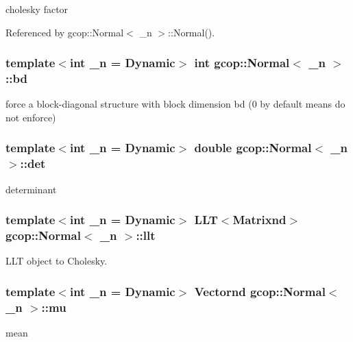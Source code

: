 cholesky factor 



\-Referenced by gcop\-::\-Normal$<$ \-\_\-n $>$\-::\-Normal().

\subsubsection[{bd}]{\setlength{\rightskip}{0pt plus 5cm}template$<$int \-\_\-n = \-Dynamic$>$ int {\bf gcop\-::\-Normal}$<$ \-\_\-n $>$\-::{\bf bd}}\label{classgcop_1_1Normal_a7f1a5099950d5e0fc7a71f97e4d03202}


force a block-\/diagonal structure with block dimension bd (0 by default means do not enforce) 

\subsubsection[{det}]{\setlength{\rightskip}{0pt plus 5cm}template$<$int \-\_\-n = \-Dynamic$>$ double {\bf gcop\-::\-Normal}$<$ \-\_\-n $>$\-::{\bf det}}\label{classgcop_1_1Normal_a3002ef044ffb2b63e8d371505ea0d6e0}


determinant 

\subsubsection[{llt}]{\setlength{\rightskip}{0pt plus 5cm}template$<$int \-\_\-n = \-Dynamic$>$ \-L\-L\-T$<${\bf \-Matrixnd}$>$ {\bf gcop\-::\-Normal}$<$ \-\_\-n $>$\-::{\bf llt}}\label{classgcop_1_1Normal_af08c704c90adabb300fc5741325ab769}


\-L\-L\-T object to \-Cholesky. 

\subsubsection[{mu}]{\setlength{\rightskip}{0pt plus 5cm}template$<$int \-\_\-n = \-Dynamic$>$ {\bf \-Vectornd} {\bf gcop\-::\-Normal}$<$ \-\_\-n $>$\-::{\bf mu}}\label{classgcop_1_1Normal_a3cfaf2326502c8165ae90c4523bd203b}


mean 



